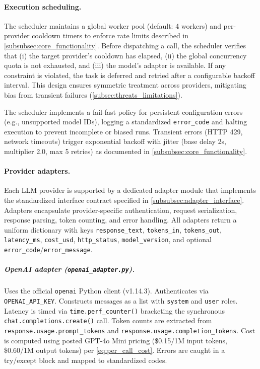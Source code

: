 \paragraph{Execution scheduling.} The scheduler maintains a global worker pool (default: 4 workers) and per-provider cooldown timers to enforce rate limits described in \cref{subsubsec:core_functionality}. Before dispatching a call, the scheduler verifies that (i) the target provider's cooldown has elapsed, (ii) the global concurrency quota is not exhausted, and (iii) the model's adapter is available. If any constraint is violated, the task is deferred and retried after a configurable backoff interval. This design ensures symmetric treatment across providers, mitigating bias from transient failures (\cref{subsec:threats_limitations}).

The scheduler implements a fail-fast policy for persistent configuration errors (e.g., unsupported model IDs), logging a standardized \texttt{error\_code} and halting execution to prevent incomplete or biased runs. Transient errors (HTTP 429, network timeouts) trigger exponential backoff with jitter (base delay 2s, multiplier 2.0, max 5 retries) as documented in \cref{subsubsec:core_functionality}.

\paragraph{Provider adapters.} Each LLM provider is supported by a dedicated adapter module that implements the standardized interface contract specified in \cref{subsubsec:adapter_interface}. Adapters encapsulate provider-specific authentication, request serialization, response parsing, token counting, and error handling. All adapters return a uniform dictionary with keys \texttt{response\_text}, \texttt{tokens\_in}, \texttt{tokens\_out}, \texttt{latency\_ms}, \texttt{cost\_usd}, \texttt{http\_status}, \texttt{model\_version}, and optional \texttt{error\_code}/\texttt{error\_message}.

\subparagraph{OpenAI adapter (\texttt{openai\_adapter.py}).} Uses the official \texttt{openai} Python client (v1.14.3). Authenticates via \texttt{OPENAI\_API\_KEY}. Constructs messages as a list with \texttt{system} and \texttt{user} roles. Latency is timed via \texttt{time.perf\_counter()} bracketing the synchronous \texttt{chat.completions.create()} call. Token counts are extracted from \texttt{response.usage.prompt\_tokens} and \texttt{response.usage.completion\_tokens}. Cost is computed using posted GPT-4o Mini pricing (\$0.15/1M input tokens, \$0.60/1M output tokens) per \cref{eq:per_call_cost}. Errors are caught in a try/except block and mapped to standardized codes.

